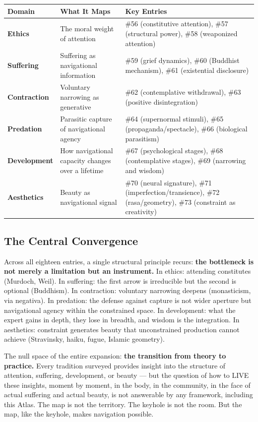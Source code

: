 \begin{longtable}{p{} p{} p{}}
\toprule
\textbf{Domain} & \textbf{What It Maps} & \textbf{Key Entries} \\
\midrule
\endhead
\textbf{Ethics} & The moral weight of attention & \#56 (constitutive attention), \#57 (structural power), \#58 (weaponized attention) \\
\textbf{Suffering} & Suffering as navigational information & \#59 (grief dynamics), \#60 (Buddhist mechanism), \#61 (existential disclosure) \\
\textbf{Contraction} & Voluntary narrowing as generative & \#62 (contemplative withdrawal), \#63 (positive disintegration) \\
\textbf{Predation} & Parasitic capture of navigational agency & \#64 (supernormal stimuli), \#65 (propaganda/spectacle), \#66 (biological parasitism) \\
\textbf{Development} & How navigational capacity changes over a lifetime & \#67 (psychological stages), \#68 (contemplative stages), \#69 (narrowing and wisdom) \\
\textbf{Aesthetics} & Beauty as navigational signal & \#70 (neural signature), \#71 (imperfection/transience), \#72 (rasa/geometry), \#73 (constraint as creativity) \\
\bottomrule
\end{longtable}



\subsection*{The Central Convergence}


Across all eighteen entries, a single structural principle recurs: \textbf{the bottleneck is not merely a limitation but an instrument.} In ethics: attending constitutes (Murdoch, Weil). In suffering: the first arrow is irreducible but the second is optional (Buddhism). In contraction: voluntary narrowing deepens (monasticism, via negativa). In predation: the defense against capture is not wider aperture but navigational agency within the constrained space. In development: what the expert gains in depth, they lose in breadth, and wisdom is the integration. In aesthetics: constraint generates beauty that unconstrained production cannot achieve (Stravinsky, haiku, fugue, Islamic geometry).


The null space of the entire expansion: \textbf{the transition from theory to practice.} Every tradition surveyed provides insight into the structure of attention, suffering, development, or beauty — but the question of how to LIVE these insights, moment by moment, in the body, in the community, in the face of actual suffering and actual beauty, is not answerable by any framework, including this Atlas. The map is not the territory. The keyhole is not the room. But the map, like the keyhole, makes navigation possible.


